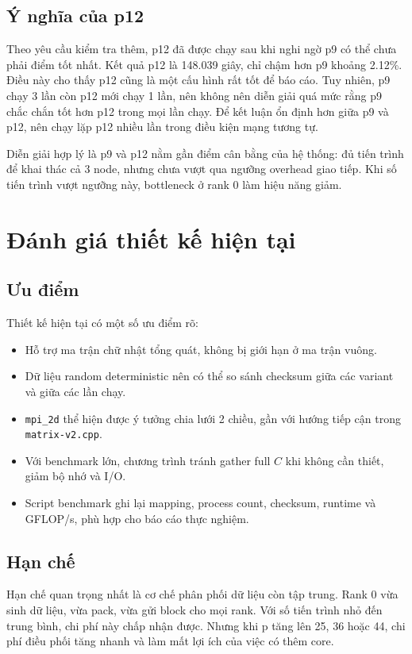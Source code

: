 \documentclass[12pt,a4paper]{article}
\newcommand{\code}[1]{\texttt{#1}}
\begin{document}
\subsection{Ý nghĩa của p12}
Theo yêu cầu kiểm tra thêm, p12 đã được chạy sau khi nghi ngờ p9 có thể chưa phải điểm tốt nhất. Kết quả p12 là 148.039 giây, chỉ chậm hơn p9 khoảng 2.12\%. Điều này cho thấy p12 cũng là một cấu hình rất tốt để báo cáo. Tuy nhiên, p9 chạy 3 lần còn p12 mới chạy 1 lần, nên không nên diễn giải quá mức rằng p9 chắc chắn tốt hơn p12 trong mọi lần chạy. Để kết luận ổn định hơn giữa p9 và p12, nên chạy lặp p12 nhiều lần trong điều kiện mạng tương tự.

Diễn giải hợp lý là p9 và p12 nằm gần điểm cân bằng của hệ thống: đủ tiến trình để khai thác cả 3 node, nhưng chưa vượt qua ngưỡng overhead giao tiếp. Khi số tiến trình vượt ngưỡng này, bottleneck ở rank 0 làm hiệu năng giảm.

\section{Đánh giá thiết kế hiện tại}
\subsection{Ưu điểm}
Thiết kế hiện tại có một số ưu điểm rõ:
\begin{itemize}
  \item Hỗ trợ ma trận chữ nhật tổng quát, không bị giới hạn ở ma trận vuông.
  \item Dữ liệu random deterministic nên có thể so sánh checksum giữa các variant và giữa các lần chạy.
  \item \code{mpi\_2d} thể hiện được ý tưởng chia lưới 2 chiều, gần với hướng tiếp cận trong \code{matrix-v2.cpp}.
  \item Với benchmark lớn, chương trình tránh gather full $C$ khi không cần thiết, giảm bộ nhớ và I/O.
  \item Script benchmark ghi lại mapping, process count, checksum, runtime và GFLOP/s, phù hợp cho báo cáo thực nghiệm.
\end{itemize}

\subsection{Hạn chế}
Hạn chế quan trọng nhất là cơ chế phân phối dữ liệu còn tập trung. Rank 0 vừa sinh dữ liệu, vừa pack, vừa gửi block cho mọi rank. Với số tiến trình nhỏ đến trung bình, chi phí này chấp nhận được. Nhưng khi p tăng lên 25, 36 hoặc 44, chi phí điều phối tăng nhanh và làm mất lợi ích của việc có thêm core.
\end{document}
